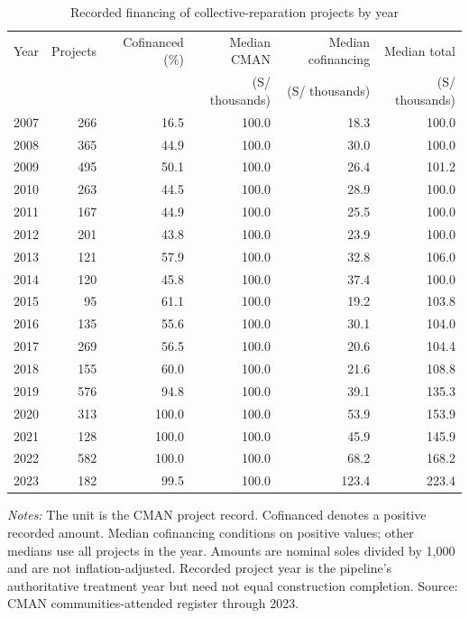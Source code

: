 \begin{table}[!htbp]
\centering
\caption{Recorded financing of collective-reparation projects by year}
\label{tab:desc_project_financing_year}
\begin{tabular}{rrrrrr}
\toprule
Year & Projects & Cofinanced (\%) & Median CMAN & Median cofinancing & Median total \\
 &  &  & (S/ thousands) & (S/ thousands) & (S/ thousands) \\
\midrule
2007 & 266 & 16.5 & 100.0 & 18.3 & 100.0 \\
2008 & 365 & 44.9 & 100.0 & 30.0 & 100.0 \\
2009 & 495 & 50.1 & 100.0 & 26.4 & 101.2 \\
2010 & 263 & 44.5 & 100.0 & 28.9 & 100.0 \\
2011 & 167 & 44.9 & 100.0 & 25.5 & 100.0 \\
2012 & 201 & 43.8 & 100.0 & 23.9 & 100.0 \\
2013 & 121 & 57.9 & 100.0 & 32.8 & 106.0 \\
2014 & 120 & 45.8 & 100.0 & 37.4 & 100.0 \\
2015 & 95 & 61.1 & 100.0 & 19.2 & 103.8 \\
2016 & 135 & 55.6 & 100.0 & 30.1 & 104.0 \\
2017 & 269 & 56.5 & 100.0 & 20.6 & 104.4 \\
2018 & 155 & 60.0 & 100.0 & 21.6 & 108.8 \\
2019 & 576 & 94.8 & 100.0 & 39.1 & 135.3 \\
2020 & 313 & 100.0 & 100.0 & 53.9 & 153.9 \\
2021 & 128 & 100.0 & 100.0 & 45.9 & 145.9 \\
2022 & 582 & 100.0 & 100.0 & 68.2 & 168.2 \\
2023 & 182 & 99.5 & 100.0 & 123.4 & 223.4 \\
\bottomrule
\end{tabular}
\parbox{0.98\linewidth}{\footnotesize \textit{Notes:} The unit is the CMAN project record. Cofinanced denotes a positive recorded amount. Median cofinancing conditions on positive values; other medians use all projects in the year. Amounts are nominal soles divided by 1,000 and are not inflation-adjusted. Recorded project year is the pipeline's authoritative treatment year but need not equal construction completion. Source: CMAN communities-attended register through 2023.}
\end{table}

